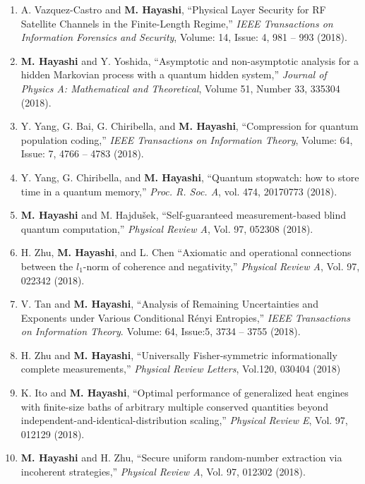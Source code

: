 \documentclass[a4paper,12pt,oneside]{article}
\begin{document}
\begin{enumerate}
\item 
A. Vazquez-Castro and \textbf{M. Hayashi},
``Physical Layer Security for RF Satellite Channels in the Finite-Length Regime,'' 
{\em IEEE Transactions on Information Forensics and Security},
Volume: 14, Issue: 4,  981 -- 993 (2018).

\item 
\textbf{M. Hayashi} and Y. Yoshida,
``Asymptotic and non-asymptotic analysis for a hidden Markovian process with a quantum hidden system,''
{\em Journal of Physics A: Mathematical and Theoretical}, 
Volume 51, Number 33, 335304 (2018).

\item 
Y. Yang, G. Bai, G. Chiribella, and \textbf{M. Hayashi}, 
``Compression for quantum population coding,''
{\em IEEE Transactions on Information Theory},
Volume: 64, Issue: 7, 4766 -- 4783 (2018). 

\item 
Y. Yang, G. Chiribella, and
\textbf{M. Hayashi},
``Quantum stopwatch: how to store time in a quantum memory,''
{\em Proc. R. Soc. A}, vol. 474, 20170773 (2018).

\item 
\textbf{M. Hayashi} and M. Hajdu\v{s}ek,
``Self-guaranteed measurement-based blind quantum computation,'' 
{\em Physical Review A}, Vol. 97, 052308 (2018).

\item 
H. Zhu, \textbf{M. Hayashi}, and L. Chen
``Axiomatic and operational connections between the $l_1$-norm of coherence and negativity,''
{\em Physical Review A}, Vol. 97, 022342 (2018).

\item 
V. Tan and \textbf{M. Hayashi},
``Analysis of Remaining Uncertainties and Exponents under Various Conditional R\'{e}nyi Entropies,''
{\em IEEE Transactions on Information Theory}.
Volume: 64, Issue:5, 3734 -- 3755 (2018). 

\item 
H. Zhu and \textbf{M. Hayashi},
``Universally Fisher-symmetric informationally complete measurements,''
{\em Physical Review Letters}, Vol.120, 030404 (2018)

\item 
K. Ito and \textbf{M. Hayashi},
``Optimal performance of generalized heat engines with finite-size baths
of arbitrary multiple conserved quantities beyond independent-and-identical-distribution scaling,''
{\em Physical Review E}, Vol. 97, 012129 (2018).

\item 
\textbf{M. Hayashi} and H. Zhu,
``Secure uniform random-number extraction via incoherent strategies,''
{\em Physical Review A}, Vol. 97, 012302 (2018).


\end{enumerate}
\end{document}
